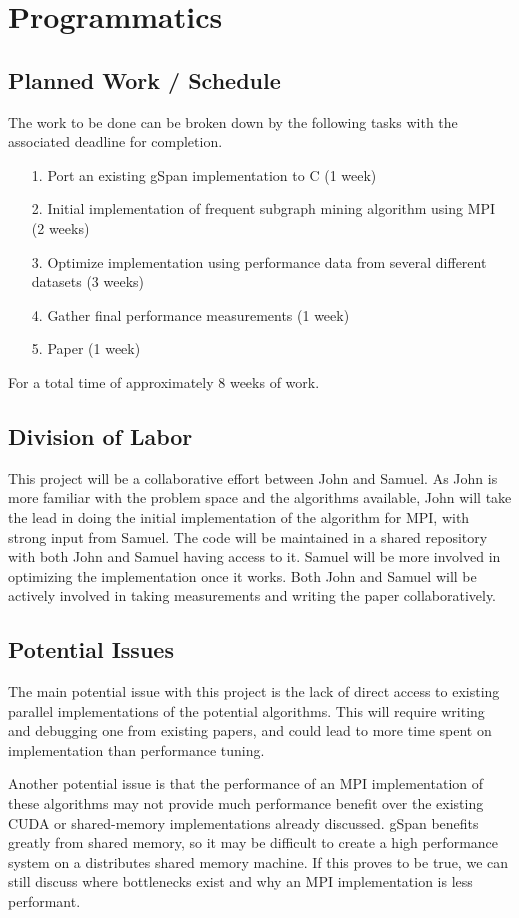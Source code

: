 \section{Programmatics}
\label{sec:programmatics}

\subsection{Planned Work / Schedule}
\label{sec:programmatics:work}

The work to be done can be broken down by the following tasks with the
associated deadline for completion.

\begin{itemize}
	\item[1.]{Port an existing gSpan implementation to C (1 week)}
	\item[2.]{Initial implementation of frequent subgraph mining
		  algorithm using MPI (2 weeks)}
	\item[3.]{Optimize implementation using performance data from several
		  different datasets (3 weeks)}
	\item[4.]{Gather final performance measurements (1 week)}
	\item[5.]{Paper (1 week)}
\end{itemize}

For a total time of approximately 8 weeks of work.

\subsection{Division of Labor}

This project will be a collaborative effort between John and Samuel.
As John is more familiar with the problem space and the algorithms available,
John will take the lead in doing the initial implementation of the algorithm
for MPI, with strong input from Samuel.  The code will be maintained in a 
shared repository with both John and Samuel having access to it. Samuel 
will be more involved in optimizing the implementation once it works.  Both
John and Samuel will be actively involved in taking measurements and writing
the paper collaboratively.

\subsection{Potential Issues}

The main potential issue with this project is the lack of direct access to
existing parallel implementations of the potential algorithms. This will 
require writing and debugging one from existing papers, and could lead to 
more time spent on implementation than performance tuning.  

Another potential issue is that the performance of an MPI implementation 
of these algorithms may not provide much performance benefit over the 
existing CUDA or shared-memory implementations already discussed.  gSpan 
benefits greatly from shared memory, so it may be difficult to create
a high performance system on a distributes shared memory machine. If this
proves to be true, we can still discuss where bottlenecks exist and why
an MPI implementation is less performant.

